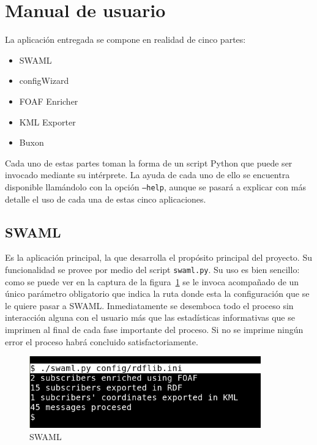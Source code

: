 
\section{Manual de usuario}

La aplicación entregada se compone en realidad de cinco partes:

\begin{itemize}
 \item SWAML
 \item configWizard
 \item FOAF Enricher
 \item KML Exporter
 \item Buxon
\end{itemize}

Cada uno de estas partes toman la forma de un script Python que puede ser 
invocado mediante su intérprete. La ayuda de cada uno de ello se encuentra
disponible llamándolo con la opción \texttt{--help}, aunque se pasará a 
explicar con más detalle el uso de cada una de estas cinco aplicaciones.

\subsection*{SWAML}

Es la aplicación principal, la que desarrolla el propósito principal del
proyecto. Su funcionalidad se provee por medio del script \texttt{swaml.py}.
Su uso es bien sencillo: como se puede ver en la captura de la 
figura~\ref{fig:swaml} se le invoca acompañado de un único parámetro obligatorio 
que indica la ruta donde esta la configuración que se le quiere pasar a 
SWAML. Inmediatamente se desemboca todo el proceso sin interacción
alguna con el usuario más que las estadísticas informativas que se 
imprimen al final de cada fase importante del proceso. Si no se
imprime ningún error el proceso habrá concluido satisfactoriamente.

\begin{figure}[H]
	\centering
	\includegraphics[width=10cm]{images/screenshots/swaml.png}
	\caption{SWAML}
	\label{fig:swaml}
\end{figure}


